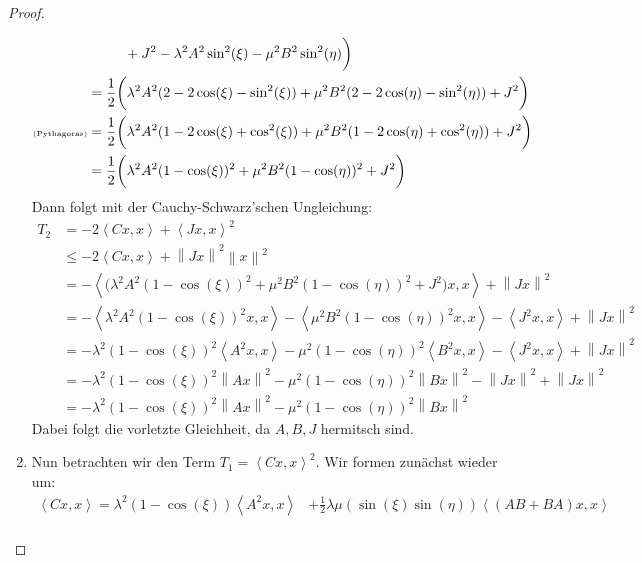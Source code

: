 \begin{proof}
\begin{enumerate}[label=\protect\circled{\arabic{*}}]
\begin{align}
            & \phantom{mmm} + J^2 - \lambda^2  A^2 \sin^2(\xi) - \mu^2  B^2 \sin^2(\eta) \biggr) \nonumber \\
            &= \frac{1}{2} \biggl( \lambda^2 A^2 (2 - 2\cos(\xi) - \sin^2(\xi)) + \mu^2 B^2 (2 - 2\cos(\eta) - \sin^2(\eta)) \nonumber + J^2 \biggr) \nonumber \\
            \text{\tiny(Pythagoras)} &= \frac{1}{2} \biggl( \lambda^2 A^2 (1 - 2\cos(\xi) + \cos^2(\xi)) + \mu^2 B^2 (1 - 2\cos(\eta) + \cos^2(\eta)) + J^2 \biggr) \nonumber \\
            &= \frac{1}{2} \biggl( \lambda^2 A^2 (1 - \cos(\xi))^2+ \mu^2 B^2 (1 - \cos(\eta))^2 + J^2 \biggr) \nonumber \\
        \end{align}
        Dann folgt mit der Cauchy-Schwarz'schen Ungleichung:
        \begin{align}
            T_2 &= - 2 \left<Cx,x \right> + \left< Jx,x \right>^2 \nonumber \\
            &\le - 2 \left<Cx,x \right> + \left\| Jx \right\|^2 \left\| x \right\|^2 \nonumber \\
            &= - \left<\biggl( \lambda^2 A^2 (1 - \cos(\xi))^2 
            + \mu^2 B^2 (1 - \cos(\eta))^2 
            + J^2 \biggr)x,x \right> + \left\| Jx \right\|^2 \nonumber \\
            &= - \left< \lambda^2 A^2 (1 - \cos(\xi))^2 x,x \right> - \left< \mu^2 B^2 (1 - \cos(\eta))^2 x,x \right> - \left< J^2 x,x \right> + \left\| Jx \right\|^2 \nonumber \\
            &= -  \lambda^2 (1 - \cos(\xi))^2 \left< A^2  x,x \right> -  \mu^2 (1 - \cos(\eta))^2 \left< B^2  x,x \right> - \left< J^2 x,x \right> + \left\| Jx \right\|^2 \nonumber \\
            &= -  \lambda^2 (1 - \cos(\xi))^2 \left\| Ax \right\|^2 -  \mu^2 (1 - \cos(\eta))^2 \left\| Bx \right\|^2 - \left\| Jx \right\|^2 + \left\| Jx \right\|^2 \nonumber \\
            &= -  \lambda^2 (1 - \cos(\xi))^2 \left\| Ax \right\|^2 -  \mu^2 (1 - \cos(\eta))^2 \left\| Bx \right\|^2 \label{eq:final_eq2}
        \end{align}
        Dabei folgt die vorletzte Gleichheit, da $A,B,J$ hermitsch sind.
        \item Nun betrachten wir den Term $T_1=\left<Cx,x \right>^2$. Wir formen zunächst wieder um:
        \begin{align}
            \left<Cx,x \right> = \lambda^2 (1 - \cos(\xi)) \left< A^2x,x \right> & + \frac{1}{2} \lambda \mu (\sin(\xi)\sin(\eta)) \left< (AB+BA)x,x \right> \nonumber \\

\end{align}
\end{enumerate}
\end{proof}
